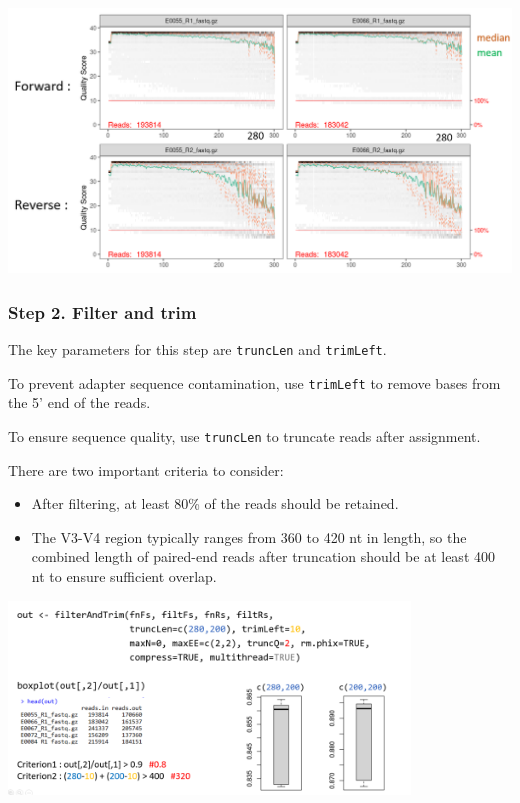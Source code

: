 \documentclass[
]{article}
\begin{document}
\includegraphics[width=1\textwidth,height=\textheight]{images/Fig7.png}

\hypertarget{step-2.-filter-and-trim}{%
\subsubsection{Step 2. Filter and trim}\label{step-2.-filter-and-trim}}

The key parameters for this step are \texttt{truncLen} and
\texttt{trimLeft}.

To prevent adapter sequence contamination, use \texttt{trimLeft} to
remove bases from the 5' end of the reads.

To ensure sequence quality, use \texttt{truncLen} to truncate reads
after assignment.

There are two important criteria to consider:

\begin{itemize}
\item
  After filtering, at least 80\% of the reads should be retained.
\item
  The V3-V4 region typically ranges from 360 to 420 nt in length, so the
  combined length of paired-end reads after truncation should be at
  least 400 nt to ensure sufficient overlap.
\end{itemize}

\includegraphics[width=0.8\textwidth,height=\textheight]{images/Fig8.png}
\end{document}
